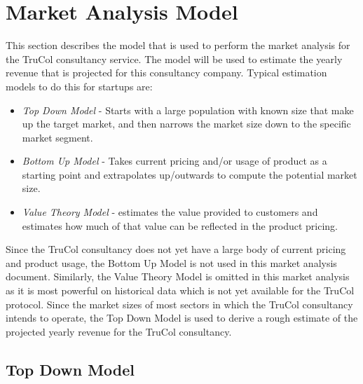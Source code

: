 \section{Market Analysis Model}\label{sec:market_analysis_model}
This section describes the model that is used to perform the market analysis for the TruCol consultancy service. The model will be used to estimate the yearly revenue that is projected for this consultancy company. Typical estimation models to do this for startups are:
\begin{itemize}
	\item \textit{Top Down Model} - Starts with a large population with known size that make up the target market, and then narrows the market size down to the specific market segment.
	\item \textit{Bottom Up Model} - Takes current pricing and/or usage of product as a starting point and extrapolates up/outwards to compute the potential market size.
	\item \textit{Value Theory Model} - estimates the value provided to customers and estimates how much of that value can be reflected in the product pricing.
\end{itemize}

\noindent Since the TruCol consultancy does not yet have a large body of current pricing and product usage, the Bottom Up Model is not used in this market analysis document. Similarly, the Value Theory Model is omitted in this market analysis as it is most powerful on historical data which is not yet available for the TruCol protocol. Since the market sizes of most sectors in which the TruCol consultancy intends to operate, the Top Down Model is used to derive a rough estimate of the projected yearly revenue for the TruCol consultancy.

\subsection{Top Down Model}\label{subsec:results_top_down}